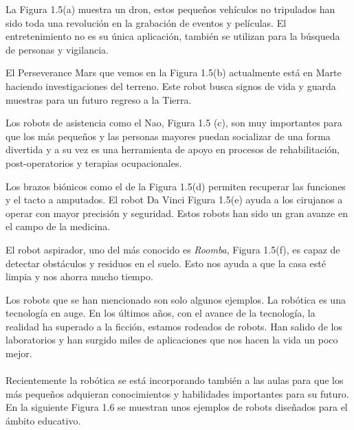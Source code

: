 La Figura 1.5(a) muestra un dron, estos pequeños vehículos no tripulados han sido toda una revolución en la grabación de eventos y películas. El entretenimiento no es su única aplicación, también se utilizan para la búsqueda de personas y vigilancia. 

El Perseverance Mars que vemos en la Figura 1.5(b) actualmente está en Marte haciendo investigaciones del terreno. Este robot busca signos de vida y guarda muestras para un futuro regreso a la Tierra.

Los robots de asistencia como el Nao, Figura 1.5 (c), son muy importantes para que los más pequeños y las personas mayores puedan socializar de una forma divertida y a su vez es una herramienta de apoyo en procesos de rehabilitación, post-operatorios y terapias ocupacionales.

Los brazos biónicos como el de la Figura 1.5(d) permiten recuperar las funciones y el tacto a amputados. El robot Da Vinci Figura 1.5(e) ayuda a los cirujanos a operar con mayor precisión y seguridad.  Estos robots han sido un gran avanze en el campo de la medicina.

El robot aspirador, uno del más conocido es \textit{Roomba}, Figura 1.5(f), es capaz de detectar obstáculos y residuos en el suelo. Esto nos ayuda a que la casa esté limpia y nos ahorra mucho tiempo.

Los robots que se han mencionado son solo algunos ejemplos. La robótica es una tecnología en auge. En los últimos años, con el avance de la tecnología, la realidad ha superado a la ficción, estamos rodeados de robots. Han salido de los laboratorios y han surgido miles de aplicaciones que nos hacen la vida un poco mejor.
\\
\\

Recientemente la robótica se está incorporando también a las aulas para que los más pequeños adquieran conocimientos y habilidades importantes para su futuro. En la siguiente Figura 1.6 se muestran unos ejemplos de robots diseñados para el ámbito educativo. \cite{roboticakids}

